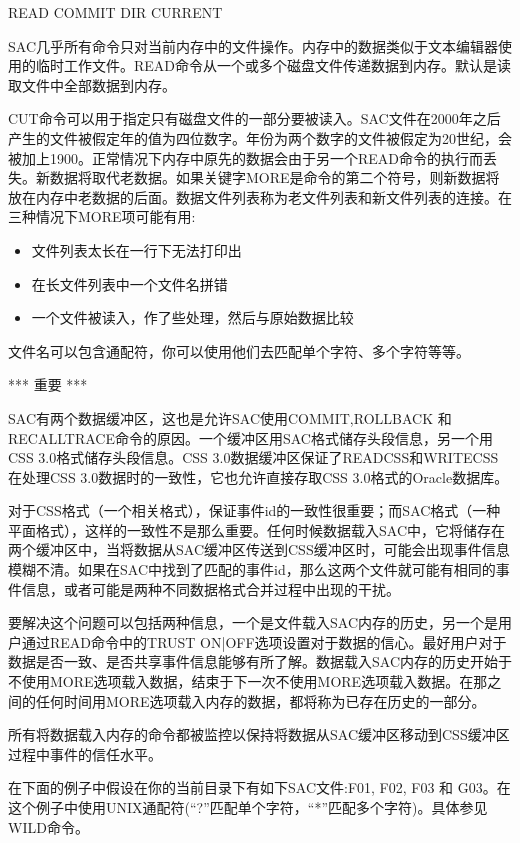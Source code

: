 READ COMMIT DIR CURRENT

SAC几乎所有命令只对当前内存中的文件操作。内存中的数据类似于文本编辑器使用的临时工作文件。READ命令从一个或多个磁盘文件传递数据到内存。默认是读取文件中全部数据到内存。

CUT命令可以用于指定只有磁盘文件的一部分要被读入。SAC文件在2000年之后产生的文件被假定年的值为四位数字。年份为两个数字的文件被假定为20世纪，会被加上1900。正常情况下内存中原先的数据会由于另一个READ命令的执行而丢失。新数据将取代老数据。如果关键字MORE是命令的第二个符号，则新数据将放在内存中老数据的后面。数据文件列表称为老文件列表和新文件列表的连接。在三种情况下MORE项可能有用:
\begin{itemize}
\item 文件列表太长在一行下无法打印出
\item 在长文件列表中一个文件名拼错
\item 一个文件被读入，作了些处理，然后与原始数据比较
\end{itemize}
文件名可以包含通配符，你可以使用他们去匹配单个字符、多个字符等等。

*** 重要 ***

SAC有两个数据缓冲区，这也是允许SAC使用COMMIT,ROLLBACK 和 RECALLTRACE命令的原因。一个缓冲区用SAC格式储存头段信息，另一个用CSS 3.0格式储存头段信息。CSS 3.0数据缓冲区保证了READCSS和WRITECSS在处理CSS 3.0数据时的一致性，它也允许直接存取CSS 3.0格式的Oracle数据库。

对于CSS格式（一个相关格式），保证事件id的一致性很重要；而SAC格式（一种平面格式），这样的一致性不是那么重要。任何时候数据载入SAC中，它将储存在两个缓冲区中，当将数据从SAC缓冲区传送到CSS缓冲区时，可能会出现事件信息模糊不清。如果在SAC中找到了匹配的事件id，那么这两个文件就可能有相同的事件信息，或者可能是两种不同数据格式合并过程中出现的干扰。

要解决这个问题可以包括两种信息，一个是文件载入SAC内存的历史，另一个是用户通过READ命令中的TRUST ON|OFF选项设置对于数据的信心。最好用户对于数据是否一致、是否共享事件信息能够有所了解。数据载入SAC内存的历史开始于不使用MORE选项载入数据，结束于下一次不使用MORE选项载入数据。在那之间的任何时间用MORE选项载入内存的数据，都将称为已存在历史的一部分。

所有将数据载入内存的命令都被监控以保持将数据从SAC缓冲区移动到CSS缓冲区过程中事件的信任水平。

在下面的例子中假设在你的当前目录下有如下SAC文件:F01, F02, F03 和 G03。在这个例子中使用UNIX通配符(``?''匹配单个字符，``*''匹配多个字符)。具体参见WILD命令。

